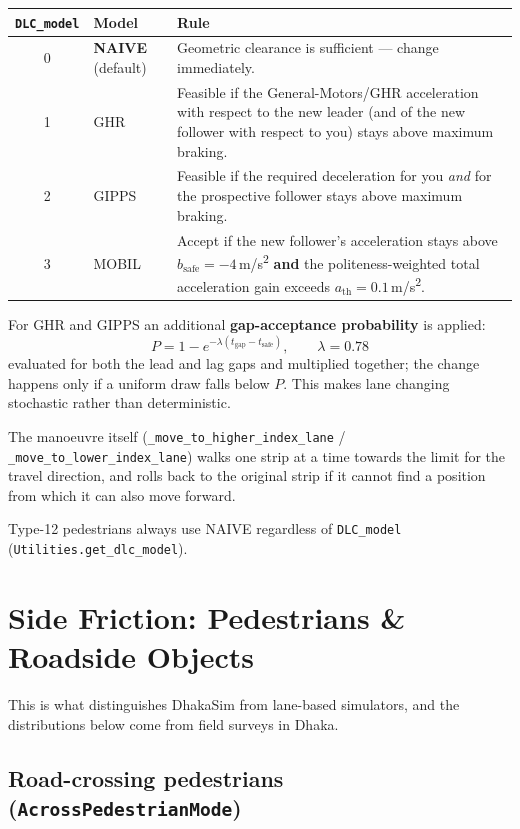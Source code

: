\documentclass[11pt, a4paper]{article}
\newcommand{\code}[1]{\texttt{#1}}
\begin{document}
\begin{tabularx}{\textwidth}{c l X}
\toprule
\textbf{\code{DLC\_model}} & \textbf{Model} & \textbf{Rule} \\
\midrule
0 & \textbf{NAIVE} (default) & Geometric clearance is sufficient --- change immediately. \\
1 & GHR & Feasible if the General-Motors/GHR acceleration with respect to the new leader (and of the new follower with respect to you) stays above maximum braking. \\
2 & GIPPS & Feasible if the required deceleration for you \emph{and} for the prospective follower stays above maximum braking. \\
3 & MOBIL & Accept if the new follower's acceleration stays above $b_{\text{safe}} = -4$\,m/s\textsuperscript{2} \textbf{and} the politeness-weighted total acceleration gain exceeds $a_{\text{th}} = 0.1$\,m/s\textsuperscript{2}. \\
\bottomrule
\end{tabularx}

\medskip
For GHR and GIPPS an additional \textbf{gap-acceptance probability} is applied:
\[
    P = 1 - e^{-\lambda\left(t_{\text{gap}} - t_{\text{safe}}\right)},
    \qquad \lambda = 0.78
\]
evaluated for both the lead and lag gaps and multiplied together; the change
happens only if a uniform draw falls below $P$. This makes lane changing
stochastic rather than deterministic.

The manoeuvre itself (\code{\_move\_to\_higher\_index\_lane} /
\code{\_move\_to\_lower\_index\_lane}) walks one strip at a time towards the
limit for the travel direction, and rolls back to the original strip if it cannot
find a position from which it can also move forward.

Type-12 pedestrians always use NAIVE regardless of \code{DLC\_model}
(\code{Utilities.get\_dlc\_model}).

\section{Side Friction: Pedestrians \& Roadside Objects}
\label{sec:friction}

This is what distinguishes DhakaSim from lane-based simulators, and the
distributions below come from field surveys in Dhaka.

\subsection{Road-crossing pedestrians (\code{AcrossPedestrianMode})}
\end{document}

